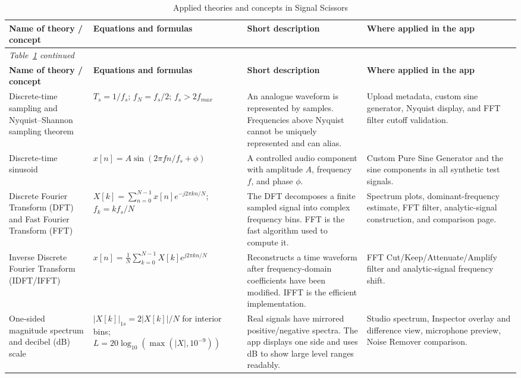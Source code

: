 \documentclass[11pt,a4paper]{article}
\renewcommand{\arraystretch}{1.22}
\begin{document}
{\small
\setlength{\tabcolsep}{2pt}
\renewcommand{\arraystretch}{1.3}
\begin{longtable}{@{}p{.19\linewidth}p{.26\linewidth}p{.25\linewidth}p{.22\linewidth}@{}}
\caption{Applied theories and concepts in Signal Scissors}\label{tab:applied-theories}\\
\toprule
\textbf{Name of theory / concept} & \textbf{Equations and formulas} & \textbf{Short description} & \textbf{Where applied in the app}\\
\midrule
\endfirsthead
\multicolumn{4}{l}{\small\itshape Table~\ref{tab:applied-theories} continued}\\
\toprule
\textbf{Name of theory / concept} & \textbf{Equations and formulas} & \textbf{Short description} & \textbf{Where applied in the app}\\
\midrule
\endhead
\bottomrule
\endfoot

Discrete-time sampling and Nyquist--Shannon sampling theorem & \(T_s=1/f_s\); \(f_N=f_s/2\); \(f_s>2f_{max}\) & An analogue waveform is represented by samples. Frequencies above Nyquist cannot be uniquely represented and can alias. & Upload metadata, custom sine generator, Nyquist display, and FFT filter cutoff validation.\\

Discrete-time sinusoid & \(x[n]=A\sin(2\pi fn/f_s+\phi)\) & A controlled audio component with amplitude \(A\), frequency \(f\), and phase \(\phi\). & Custom Pure Sine Generator and the sine components in all synthetic test signals.\\

Discrete Fourier Transform (DFT) and Fast Fourier Transform (FFT) & \(X[k]=\sum_{n=0}^{N-1}x[n]e^{-j2\pi kn/N}\); \(f_k=kf_s/N\) & The DFT decomposes a finite sampled signal into complex frequency bins. FFT is the fast algorithm used to compute it. & Spectrum plots, dominant-frequency estimate, FFT filter, analytic-signal construction, and comparison page.\\

Inverse Discrete Fourier Transform (IDFT/IFFT) & \(x[n]=\frac1N\sum_{k=0}^{N-1}X[k]e^{j2\pi kn/N}\) & Reconstructs a time waveform after frequency-domain coefficients have been modified. IFFT is the efficient implementation. & FFT Cut/Keep/Attenuate/Amplify filter and analytic-signal frequency shift.\\

One-sided magnitude spectrum and decibel (dB) scale & \(|X[k]|_{1s}=2|X[k]|/N\) for interior bins; \(L=20\log_{10}(\max(|X|,10^{-9}))\) & Real signals have mirrored positive/negative spectra. The app displays one side and uses dB to show large level ranges readably. & Studio spectrum, Inspector overlay and difference view, microphone preview, Noise Remover comparison.\\


\end{longtable}}
\end{document}
